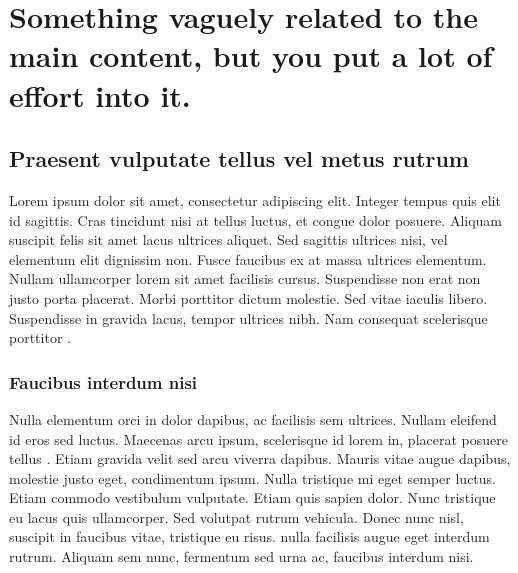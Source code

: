 % 
% 
% 




\chapter{Something vaguely related to the main content, but you put a lot of effort into it.}


\section{Praesent vulputate tellus vel metus rutrum}


Lorem ipsum dolor sit amet, consectetur adipiscing elit. Integer tempus quis elit id sagittis. Cras tincidunt nisi at tellus luctus, et congue dolor posuere. Aliquam suscipit felis sit amet lacus ultrices aliquet. Sed sagittis ultrices nisi, vel elementum elit dignissim non. Fusce faucibus ex at massa ultrices elementum. Nullam ullamcorper lorem sit amet facilisis cursus. Suspendisse non erat non justo porta placerat. Morbi porttitor dictum molestie. Sed vitae iaculis libero. Suspendisse in gravida lacus, tempor ultrices nibh. Nam consequat scelerisque porttitor \cite{europa_rohs, europa_ce}.


\subsection{Faucibus interdum nisi}

Nulla elementum orci in dolor dapibus, ac facilisis sem ultrices. Nullam eleifend id eros sed luctus. Maecenas arcu ipsum, scelerisque id lorem in, placerat posuere tellus \cite{proceedings_piezo}. Etiam gravida velit sed arcu viverra dapibus. Mauris vitae augue dapibus, molestie justo eget, condimentum ipsum. Nulla tristique mi eget semper luctus. Etiam commodo vestibulum vulputate. Etiam quis sapien dolor. Nunc tristique eu lacus quis ullamcorper. Sed volutpat rutrum vehicula. Donec nunc nisl, suscipit in faucibus vitae, tristique eu risus.  nulla facilisis augue eget interdum rutrum. Aliquam sem nunc, fermentum sed urna ac, faucibus interdum nisi.


